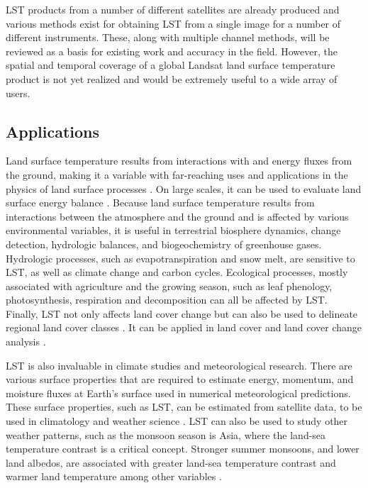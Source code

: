\documentclass{book}
\begin{document}
LST products from a number of different satellites are already produced and various methods exist for obtaining LST from a single image for a number of different instruments.  These, along with multiple channel methods, will be reviewed as a basis for existing work and accuracy in the field.  However, the spatial and temporal coverage of a global Landsat land surface temperature product is not yet realized and would be extremely useful to a wide array of users.

\subsection{Applications}
\label{sec:applications}

Land surface temperature results from interactions with and energy fluxes from the ground, making it a variable with far-reaching uses and applications in the physics of land surface processes \cite{sellers_1988}.  On large scales, it can be used to evaluate land surface energy balance \cite{diak_1993}.  Because land surface temperature results from interactions between the atmosphere and the ground and is affected by various environmental variables, it is useful in terrestrial biosphere dynamics, change detection, hydrologic balances, and biogeochemistry of greenhouse gases.  Hydrologic processes, such as evapotranspiration and snow melt, are sensitive to LST, as well as climate change and carbon cycles.  Ecological processes, mostly associated with agriculture and the growing season, such as leaf phenology, photosynthesis, respiration and decomposition can all be affected by LST.  Finally, LST not only affects land cover change but can also be used to delineate regional land cover classes \cite{running_1994}.  It can be applied in land cover and land cover change analysis \cite{ehrlich_1996}.

LST is also invaluable in climate studies and meteorological research.  There are various surface properties that are required to estimate energy, momentum, and moisture fluxes at Earth's surface used in numerical meteorological predictions.  These surface properties, such as LST, can be estimated from satellite data, to be used in climatology and weather science \cite{price_1982}.  LST can also be used to study other weather patterns, such as the monsoon season is Asia, where the land-sea temperature contrast is a critical concept.  Stronger summer monsoons, and lower land albedos, are associated with greater land-sea temperature contrast and warmer land temperature among other variables \cite{meehl_1994}.
\end{document}
